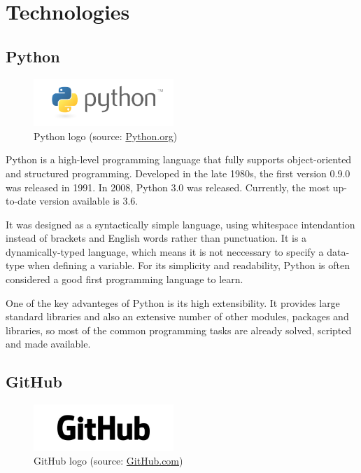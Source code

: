 \chapter{Technologies}
\label{3-technologie}


\section{Python}

\begin{figure}[H] \centering
      \includegraphics[width=150pt]{./pictures/python-logo-master-v3-TM.png}
      \caption[Python logo]{Python logo (source:
\href{https://www.python.org/static/community_logos/python-logo-master-v3-TM.png}{Python.org})}
      \label{fig:python}
  \end{figure}

Python is a high-level programming language that fully supports object-oriented and structured programming. Developed in the late 1980s, the first version 0.9.0 was released in 1991. In 2008, Python 3.0 was released. Currently, the most up-to-date version available is 3.6. 

It was designed as a syntactically simple language, using whitespace intendantion instead of brackets and English words rather than punctuation. It is a dynamically-typed language, which means it is not neccessary to specify a data-type when defining a variable. For its simplicity and readability, Python is often considered a good first programming language to learn.

One of the key advanteges of Python is its high extensibility. It provides large standard libraries and also an extensive number of other modules, packages and libraries, so most of the common programming tasks are already solved, scripted and made available.



\section{GitHub}

\begin{figure}[H] \centering
      \includegraphics[width=150pt]{./pictures/github.png}
      \caption[GitHub logo]{GitHub logo (source:
\href{GitHub}{GitHub.com})}
      \label{fig:GitHub}
  \end{figure}

